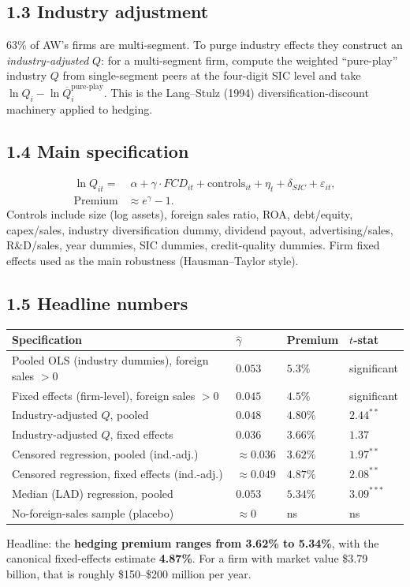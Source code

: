\documentclass[11pt]{article}
\begin{document}
\subsection*{1.3 Industry adjustment}
63\% of AW's firms are multi-segment. To purge industry effects they construct an \emph{industry-adjusted} $Q$: for a multi-segment firm, compute the weighted ``pure-play'' industry $Q$ from single-segment peers at the four-digit SIC level and take $\ln Q_i - \ln \overline Q^{\text{pure-play}}_i$. This is the Lang--Stulz (1994) diversification-discount machinery applied to hedging.

\subsection*{1.4 Main specification}
\begin{align*}
\ln Q_{it}=&\;\alpha + \gamma\cdot FCD_{it} + \text{controls}_{it}+\eta_t+\delta_{SIC}+\varepsilon_{it},\\
\text{Premium} &\approx e^{\gamma}-1.
\end{align*}
Controls include size (log assets), foreign sales ratio, ROA, debt/equity, capex/sales, industry diversification dummy, dividend payout, advertising/sales, R\&D/sales, year dummies, SIC dummies, credit-quality dummies. Firm fixed effects used as the main robustness (Hausman--Taylor style).

\subsection*{1.5 Headline numbers}
\begin{tabular}{p{5.8cm}p{2.6cm}p{2.2cm}p{1.8cm}}
\toprule
\textbf{Specification} & \textbf{$\hat\gamma$} & \textbf{Premium} & \textbf{$t$-stat} \\
\midrule
Pooled OLS (industry dummies), foreign sales $>0$ & $0.053$ & $5.3\%$ & significant \\
Fixed effects (firm-level), foreign sales $>0$ & $0.045$ & $4.5\%$ & significant \\
Industry-adjusted $Q$, pooled & $0.048$ & $4.80\%$ & $2.44^{**}$ \\
Industry-adjusted $Q$, fixed effects & $0.036$ & $3.66\%$ & $1.37$ \\
Censored regression, pooled (ind.-adj.) & $\approx 0.036$ & $3.62\%$ & $1.97^{**}$ \\
Censored regression, fixed effects (ind.-adj.) & $\approx 0.049$ & $\mathbf{4.87\%}$ & $2.08^{**}$ \\
Median (LAD) regression, pooled & $0.053$ & $5.34\%$ & $3.09^{***}$ \\
No-foreign-sales sample (placebo) & $\approx 0$ & ns & ns \\
\bottomrule
\end{tabular}
Headline: the \textbf{hedging premium ranges from 3.62\% to 5.34\%}, with the canonical fixed-effects estimate \textbf{4.87\%}. For a firm with market value \$3.79 billion, that is roughly \$150--\$200 million per year.
\end{document}

